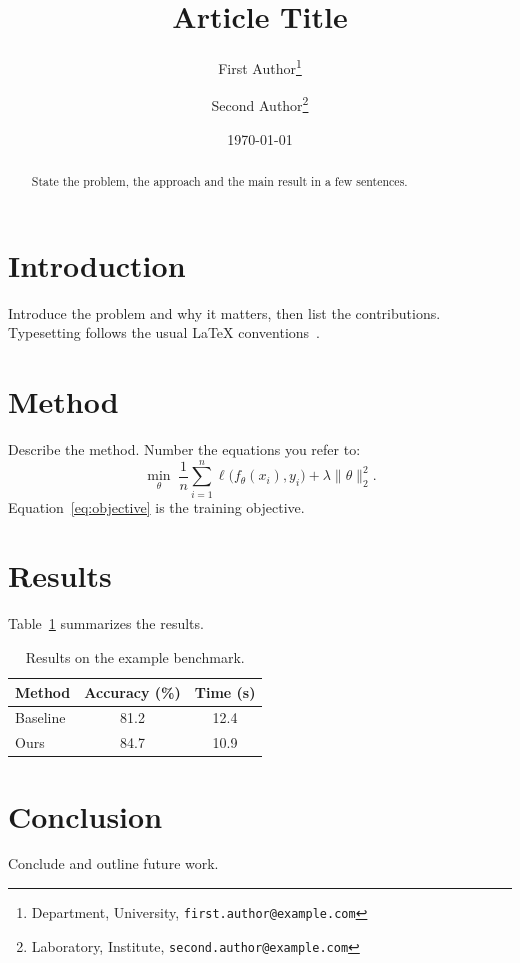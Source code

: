 \documentclass[11pt,a4paper]{article}
\title{Article Title}
\author{First Author\thanks{Department, University, \texttt{first.author@example.com}}
  \and Second Author\thanks{Laboratory, Institute, \texttt{second.author@example.com}}}
\date{\today}
\begin{document}
\maketitle

\begin{abstract}
State the problem, the approach and the main result in a few sentences.
\end{abstract}

\section{Introduction}
Introduce the problem and why it matters, then list the contributions.
Typesetting follows the usual \LaTeX{} conventions~\cite{lamport1994latex}.

\section{Method}
Describe the method. Number the equations you refer to:
\begin{equation}
  \label{eq:objective}
  \min_{\theta} \; \frac{1}{n} \sum_{i=1}^{n} \ell\bigl(f_\theta(x_i), y_i\bigr) + \lambda \lVert \theta \rVert_2^2 .
\end{equation}
Equation~\eqref{eq:objective} is the training objective.

\section{Results}
Table~\ref{tab:results} summarizes the results.

\begin{table}[t]
  \centering
  \caption{Results on the example benchmark.}
  \label{tab:results}
  \begin{tabular}{lcc}
    \toprule
    Method   & Accuracy (\%) & Time (s) \\
    \midrule
    Baseline & 81.2          & 12.4     \\
    Ours     & 84.7          & 10.9     \\
    \bottomrule
  \end{tabular}
\end{table}

\section{Conclusion}
Conclude and outline future work.


\end{document}
